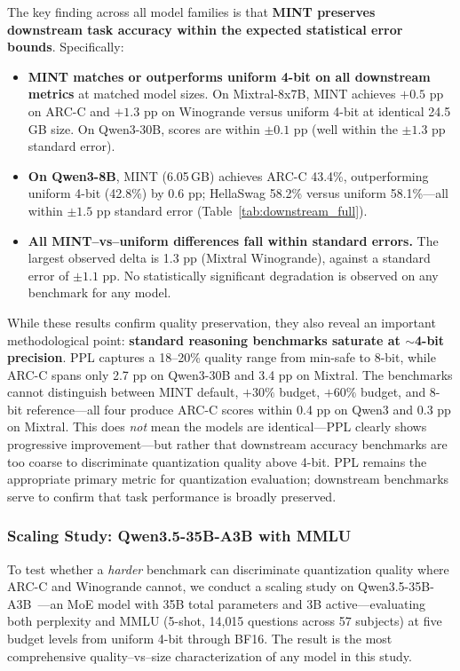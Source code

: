 \documentclass{article}
\begin{document}
The key finding across all model families is that \textbf{MINT preserves downstream task accuracy within the expected statistical error bounds}. Specifically:

\begin{itemize}
    \item \textbf{MINT matches or outperforms uniform 4-bit on all downstream metrics} at matched model sizes. On Mixtral-8x7B, MINT achieves $+0.5$ pp on ARC-C and $+1.3$ pp on Winogrande versus uniform 4-bit at identical 24.5\,GB size. On Qwen3-30B, scores are within $\pm 0.1$ pp (well within the $\pm 1.3$ pp standard error).

    \item \textbf{On Qwen3-8B}, MINT (6.05\,GB) achieves ARC-C 43.4\%, outperforming uniform 4-bit (42.8\%) by 0.6 pp; HellaSwag 58.2\% versus uniform 58.1\%---all within $\pm 1.5$ pp standard error (Table~\ref{tab:downstream_full}).

    \item \textbf{All MINT--vs--uniform differences fall within standard errors.} The largest observed delta is 1.3 pp (Mixtral Winogrande), against a standard error of $\pm 1.1$ pp. No statistically significant degradation is observed on any benchmark for any model.
\end{itemize}

While these results confirm quality preservation, they also reveal an important methodological point: \textbf{standard reasoning benchmarks saturate at ${\sim}$4-bit precision}. PPL captures a 18--20\% quality range from min-safe to 8-bit, while ARC-C spans only 2.7 pp on Qwen3-30B and 3.4 pp on Mixtral. The benchmarks cannot distinguish between MINT default, $+30\%$ budget, $+60\%$ budget, and 8-bit reference---all four produce ARC-C scores within 0.4 pp on Qwen3 and 0.3 pp on Mixtral. This does \emph{not} mean the models are identical---PPL clearly shows progressive improvement---but rather that downstream accuracy benchmarks are too coarse to discriminate quantization quality above 4-bit. PPL remains the appropriate primary metric for quantization evaluation; downstream benchmarks serve to confirm that task performance is broadly preserved.

\subsubsection{Scaling Study: Qwen3.5-35B-A3B with MMLU}
\label{sec:qwen35_scaling}

To test whether a \emph{harder} benchmark can discriminate quantization quality where ARC-C and Winogrande cannot, we conduct a scaling study on Qwen3.5-35B-A3B~\cite{qwen3.5}---an MoE model with 35B total parameters and 3B active---evaluating both perplexity and MMLU (5-shot, 14{,}015 questions across 57 subjects) at five budget levels from uniform 4-bit through BF16. The result is the most comprehensive quality--vs--size characterization of any model in this study.
\end{document}
